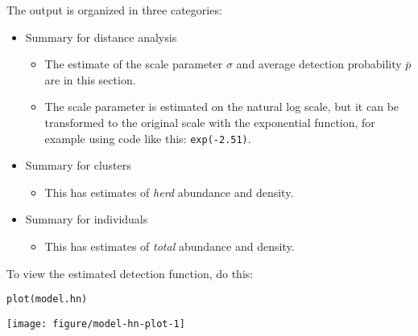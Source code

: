 \documentclass[12pt]{article}\usepackage[]{graphicx}\usepackage[]{xcolor}
\makeatletter
\newcommand{\hlstd}[1]{\textcolor[rgb]{0,0,0}{#1}}%
\newcommand{\hlkwd}[1]{\textcolor[rgb]{0.004,0.004,0.506}{#1}}%
\newenvironment{kframe}{%
 \def\at@end@of@kframe{}%
 \ifinner\ifhmode%
  \def\at@end@of@kframe{\end{minipage}}%
  \begin{minipage}{\columnwidth}%
 \fi\fi%
 \def\FrameCommand##1{\hskip\@totalleftmargin \hskip-\fboxsep
 \colorbox{shadecolor}{##1}\hskip-\fboxsep
     \hskip-\linewidth \hskip-\@totalleftmargin \hskip\columnwidth}%
 \MakeFramed {\advance\hsize-\width
   \@totalleftmargin\z@ \linewidth\hsize
   \@setminipage}}%
 {\par\unskip\endMakeFramed%
 \at@end@of@kframe}
\newenvironment{knitrout}{}{} %
\newcommand{\inr}[1]{\colorbox{inlinecolor}{\texttt{#1}}}
\makeatother
\begin{document}
The output is organized in three categories:
\begin{itemize}
  \item Summary for distance analysis
  \begin{itemize}
    \item The estimate of the scale parameter $\sigma$ and average
      detection probability $\bar{p}$ are in this section.
    \item The scale parameter is estimated on the natural log scale,
      but it can be transformed to the original scale with the
      exponential function, for example using code like this: \inr{exp(-2.51)}.
  \end{itemize}
  \item Summary for clusters
  \begin{itemize}
    \item This has estimates of {\it herd} abundance and density.      
  \end{itemize}
  \item Summary for individuals
  \begin{itemize}
    \item This has estimates of {\it total} abundance and density.      
  \end{itemize}
\end{itemize}


To view the estimated detection function, do this:

\begin{knitrout}
\color{fgcolor}\begin{kframe}
\begin{alltt}
\hlkwd{plot}\hlstd{(model.hn)}
\end{alltt}
\end{kframe}

{\centering \texttt{[image: figure/model-hn-plot-1]} 

}


\end{knitrout}
\end{document}
